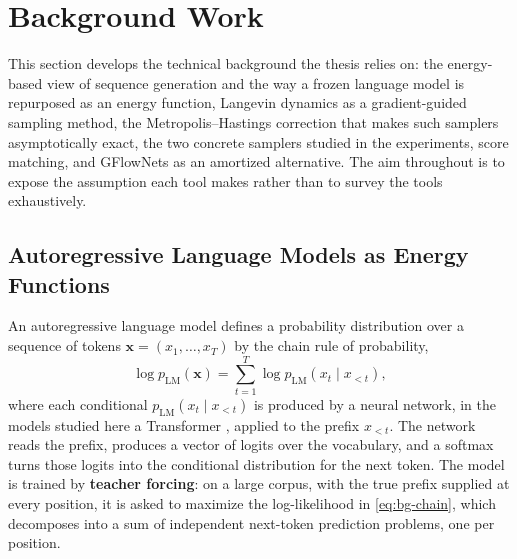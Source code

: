 \section{Background Work}
\label{ch:background}

This section develops the technical background the thesis relies on: the energy-based view of sequence generation and the way a frozen language model is repurposed as an energy function, Langevin dynamics as a gradient-guided sampling method, the Metropolis--Hastings correction that makes such samplers asymptotically exact, the two concrete samplers studied in the experiments, score matching, and GFlowNets as an amortized alternative. The aim throughout is to expose the assumption each tool makes rather than to survey the tools exhaustively.

\subsection{Autoregressive Language Models as Energy Functions}
\label{sec:bg-ebm}

An autoregressive language model defines a probability distribution over a sequence of tokens $\bm{x} = (x_1, \dots, x_T)$ by the chain rule of probability,
\begin{equation}
    \log p_{\text{LM}}(\bm{x}) = \sum_{t=1}^{T} \log p_{\text{LM}}(x_t \mid x_{<t}),
    \label{eq:bg-chain}
\end{equation}
where each conditional $p_{\text{LM}}(x_t \mid x_{<t})$ is produced by a neural network, in the models studied here a Transformer \citep{vaswani2017attention}, applied to the prefix $x_{<t}$. The network reads the prefix, produces a vector of logits over the vocabulary, and a softmax turns those logits into the conditional distribution for the next token. The model is trained by \textbf{teacher forcing}: on a large corpus, with the true prefix supplied at every position, it is asked to maximize the log-likelihood in \eqref{eq:bg-chain}, which decomposes into a sum of independent next-token prediction problems, one per position.

